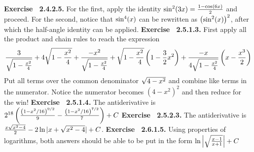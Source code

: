  {\noindent \protect \bf  Exercise ~2.4.2.5.} For the first, apply the identity $\protect \qopname  \relax o{sin}^2(3x)=\protect \frac  {1-\protect \qopname  \relax o{cos}(6x)}{2}$ and proceed. For the second, notice that $\protect \qopname  \relax o{sin}^4(x)$ can be rewritten as $\left (\protect \qopname  \relax o{sin}^2(x)\right )^2$, after which the half-angle identity can be applied. \protect \newline  \protect \newline  
 {\noindent \protect \bf  Exercise ~2.5.1.3.} First apply all the product and chain rules to reach the expression $$\protect \frac  {3}{\protect \sqrt  {1-\protect \frac  {x^2}{4}}}+4\protect \sqrt  {1-\protect \frac  {x^2}{4}}+\protect \frac  {-x^2}{\protect \sqrt  {1-\protect \frac  {x^2}{4}}}+\protect \sqrt  {1-\protect \frac  {x^2}{4}}\left (1-\protect \frac  {3}{2}x^2\right )+\protect \frac  {-x}{4\protect \sqrt  {1-\protect \frac  {x^2}{4}}}\left (x-\protect \frac  {x^3}{2}\right ) $$ Put all terms over the common denominator $\protect \sqrt  {4-x^2}$ and combine like terms in the numerator. Notice the numerator becomes $\left (4-x^2\right )^2$ and then reduce for the win! \protect \newline  \protect \newline  
 {\noindent \protect \bf  Exercise ~2.5.1.4.} The antiderivative is $2^{18}\left (\protect \frac  {\left (1-x^2/16\right )^{9/2}}{9}-\protect \frac  {\left (1-x^2/16\right )^{7/2}}{7}\right )+C$ \protect \newline  \protect \newline  
 {\noindent \protect \bf  Exercise ~2.5.2.3.} The antiderivative is $\protect \frac  {x\protect \sqrt  {x^2-4}}{2}-2\protect \qopname  \relax o{ln}|x+\protect \sqrt  {x^2-4}|+C$. \protect \newline  \protect \newline  
 {\noindent \protect \bf  Exercise ~2.6.1.5.} Using properties of logarithms, both answers should be able to be put in the form $\protect \qopname  \relax o{ln}\left | \protect \sqrt  {\protect \frac  {x-1}{x+1}}\right |+C$ \protect \newline  \protect \newline  
